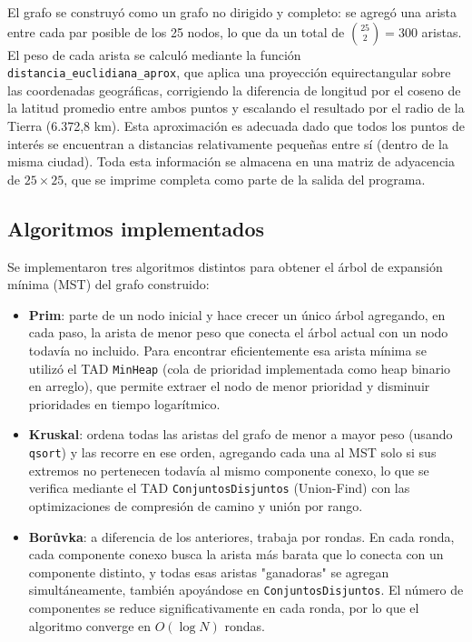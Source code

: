 \documentclass[12pt,letterpaper]{article}
\begin{document}
El grafo se construyó como un grafo no dirigido y completo: se agregó una arista entre cada par
posible de los 25 nodos, lo que da un total de $\binom{25}{2} = 300$ aristas. El peso de cada
arista se calculó mediante la función \texttt{distancia\_euclidiana\_aprox}, que aplica una
proyección equirectangular sobre las coordenadas geográficas, corrigiendo la diferencia de
longitud por el coseno de la latitud promedio entre ambos puntos y escalando el resultado por el
radio de la Tierra (6.372,8 km). Esta aproximación es adecuada dado que todos los puntos de
interés se encuentran a distancias relativamente pequeñas entre sí (dentro de la misma ciudad).
Toda esta información se almacena en una matriz de adyacencia de $25\times25$, que se imprime
completa como parte de la salida del programa.

\subsection{Algoritmos implementados}

Se implementaron tres algoritmos distintos para obtener el árbol de expansión mínima (MST) del
grafo construido:

\begin{itemize}
    \item \textbf{Prim}: parte de un nodo inicial y hace crecer un único árbol agregando, en
    cada paso, la arista de menor peso que conecta el árbol actual con un nodo todavía no
    incluido. Para encontrar eficientemente esa arista mínima se utilizó el TAD
    \texttt{MinHeap} (cola de prioridad implementada como heap binario en arreglo), que permite
    extraer el nodo de menor prioridad y disminuir prioridades en tiempo logarítmico.

    \item \textbf{Kruskal}: ordena todas las aristas del grafo de menor a mayor peso (usando
    \texttt{qsort}) y las recorre en ese orden, agregando cada una al MST solo si sus extremos no
    pertenecen todavía al mismo componente conexo, lo que se verifica mediante el TAD
    \texttt{ConjuntosDisjuntos} (Union-Find) con las optimizaciones de compresión de camino y
    unión por rango.

    \item \textbf{Borůvka}: a diferencia de los anteriores, trabaja por rondas. En cada ronda,
    cada componente conexo busca la arista más barata que lo conecta con un componente distinto,
    y todas esas aristas "ganadoras" se agregan simultáneamente, también apoyándose en
    \texttt{ConjuntosDisjuntos}. El número de componentes se reduce significativamente en cada
    ronda, por lo que el algoritmo converge en $O(\log N)$ rondas.
\end{itemize}
\end{document}
